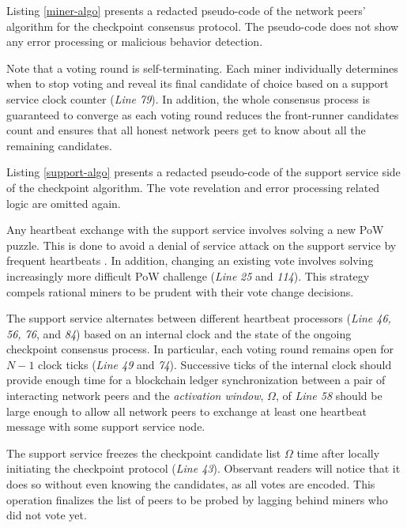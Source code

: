 Listing \ref{miner-algo} presents a redacted pseudo-code of the network peers' algorithm for the checkpoint consensus protocol. The pseudo-code does not show any error processing or malicious behavior detection.

\lstset{caption=A miner's perspective of the checkpoint protocol, label=miner-algo}
 

Note that a voting round is self-terminating. Each miner individually determines when to stop voting and reveal its final candidate of choice based on a support service clock counter (\textit{Line 79}). In addition, the whole consensus process is guaranteed to converge as each voting round reduces the front-runner candidates count and ensures that all honest network peers get to know about all the remaining candidates. 

Listing \ref{support-algo} presents a redacted pseudo-code of the support service side of the checkpoint algorithm. The vote revelation and error processing related logic are omitted again.

\lstset{caption=Support service's perspective of the checkpoint protocol, label=support-algo}


Any heartbeat exchange with the support service involves solving a new PoW puzzle. This is done to avoid a denial of service attack on the support service by frequent heartbeats \cite{Back02hashcash}. In addition, changing an existing vote involves solving increasingly more difficult PoW challenge (\textit{Line} \textit{25} and \textit{114}). This strategy compels rational miners to be prudent with their vote change decisions. 

The support service alternates between different heartbeat processors (\textit{Line 46, 56, 76}, and \textit{84}) based on an internal clock and the state of the ongoing checkpoint consensus process. In particular, each voting round remains open for $N - 1$ clock ticks (\textit{Line 49} and \textit{74}). Successive ticks of the internal clock should provide enough time for a blockchain ledger synchronization between a pair of interacting network peers and the \textit{activation window}, $\Omega$, of \textit{Line 58} should be large enough to allow all network peers to exchange at least one heartbeat message with some support service node.

The support service freezes the checkpoint candidate list $\Omega$ time after locally initiating the checkpoint protocol (\textit{Line 43}). Observant readers will notice that it does so without even knowing the candidates, as all votes are encoded. This operation finalizes the list of peers to be probed by lagging behind miners who did not vote yet.    
        
